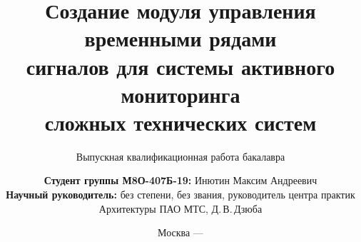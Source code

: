 \title[Создание модуля управления временными рядами сигналов для системы активного мониторинга сложных технических систем]{\textbf{Создание модуля управления временными рядами\\сигналов для системы активного мониторинга\\сложных технических систем}}
\subtitle{Выпускная квалификационная работа бакалавра}


\author[Инютин Максим Андреевич]
{
	\textbf{Студент группы М8О-407Б-19:} Инютин Максим Андреевич\\
	\textbf{Научный руководитель:} без степени, без звания, руководитель центра практик Архитектуры ПАО МТС, Д.\,В.\,Дзюба
}


\date{Москва --- \the\year}

